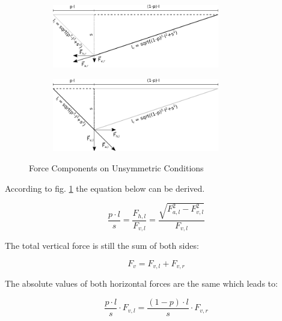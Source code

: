 \begin{figure}[htb] \centering
	\begin{subfigure}{\textwidth} \centering
		\includegraphics[width=0.8\textwidth]{images/slacklineWithForcesUnsymmetricRightSide.pdf}
	\end{subfigure} \par\bigskip
	\begin{subfigure}{\textwidth} \centering
		\includegraphics[width=0.8\textwidth]{images/slacklineWithForcesUnsymmetricLeftSide.pdf}
	\end{subfigure}
	\caption{Force Components on Unsymmetric Conditions }
	\label{fig:slacklineWithForcesUnsymmetric}
\end{figure}

According to fig. \ref{fig:slacklineWithForcesUnsymmetric} the equation below can be derived.

\begin{equation}
	\frac{p\cdot l}{s} = \frac{F_{h,l}}{F_{v,l}} = \frac{ \sqrt{F_{a,l}^2 - F_{v,l}^2 }}{F_{v,l}}
	\label{eqn:geometricPropertiesUnsymmetric}
\end{equation}

The total vertical force is still the sum of both sides:

\begin{equation}
	F_v = F_{v,l} + F_{v,r}
	\label{eqn:verticalForce}
\end{equation}

The absolute values of both horizontal forces are the same which leads to:

\begin{equation}
	\frac{p\cdot l}{s}\cdot F_{v,l} = \frac{(1-p)\cdot l}{s}\cdot F_{v,r} 
	\label{eqn:horizontalEquality}
\end{equation}

